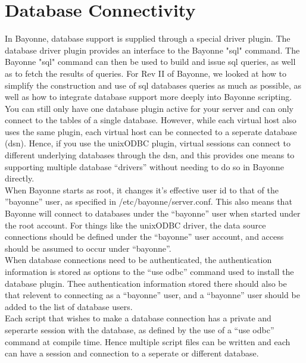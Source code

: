 \documentclass[a4paper,12pt]{article}
\begin{document}
\section{Database Connectivity}

In Bayonne, database support is supplied through a special driver plugin.
The database driver plugin provides an interface to the Bayonne "sql"
command.  The Bayonne "sql" command can then be used to build and issue
sql queries, as well as to fetch the results of queries.  For Rev II of
Bayonne, we looked at how to simplify the construction and use of sql
databases queries as much as possible, as well as how to integrate 
database support more deeply into Bayonne scripting. \\

You can still only have one database plugin active for your server and can
only connect to the tables of a single database.  However, while each virtual
host also uses the same plugin, each virtual host can be connected to a
seperate database (dsn).  Hence, if you use the unixODBC plugin, virtual
sessions can connect to different underlying databases through the dsn, and
this provides one means to supporting multiple database ``drivers'' without
needing to do so in Bayonne directly. \\

When Bayonne starts as root, it changes it's effective user id to that
of the ''bayonne'' user, as specified in /etc/bayonne/server.conf.  This
also means that Bayonne will connect to databases under the ``bayonne''
user when started under the root account.  For things like the unixODBC
driver, the data source connections should be defined under the
``bayonne'' user account, and access should be assumed to occur under
``bayonne''.  \\

When database connections need to be authenticated, the authentication
information is stored as options to the ``use odbc'' command used to
install the database plugin.  Thee authentication information stored
there should also be that relevent to connecting as a ``bayonne'' user,
and a ``bayonne'' user should be added to the list of database users. \\

Each script that wishes to make a database connection has a private and
seperarte session with the database, as defined by the use of a ``use
odbc'' command at compile time.  Hence multiple script files can be written
and each can have a session and connection to a seperate or different
database. \\
\end{document}
